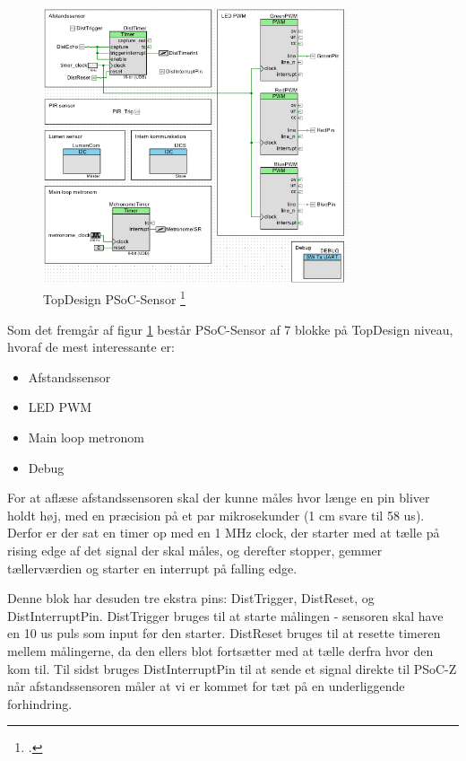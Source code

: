 \begin{figure}[H] \centering
    \includegraphics[width=0.8\textwidth]{Filer/PSoC-Sensor-TopDesign.PNG}
    \caption{TopDesign PSoC-Sensor \footcite{dk8000-addon}}
    \label{fig:Sensor-top}
\end{figure}

Som det fremgår af figur \ref{fig:Sensor-top} består PSoC-Sensor af 7 blokke på TopDesign niveau, hvoraf de mest interessante er:

\begin{itemize}
	\item Afstandssensor
	\item LED PWM
	\item Main loop metronom
	\item Debug
\end{itemize}

For at aflæse afstandssensoren skal der kunne måles hvor længe en pin bliver holdt høj, med en præcision på et par mikrosekunder (1 cm svare til 58 us). Derfor er der sat en timer op med en 1 MHz clock, der starter med at tælle på rising edge af det signal der skal måles, og derefter stopper, gemmer tællerværdien og starter en interrupt på falling edge.

Denne blok har desuden tre ekstra pins: DistTrigger, DistReset, og DistInterruptPin. DistTrigger bruges til at starte målingen - sensoren skal have en 10 us puls som input før den starter. DistReset bruges til at resette timeren mellem målingerne, da den ellers blot fortsætter med at tælle derfra hvor den kom til. Til sidst bruges DistInterruptPin til at sende et signal direkte til PSoC-Z når afstandssensoren måler at vi er kommet for tæt på en underliggende forhindring.

